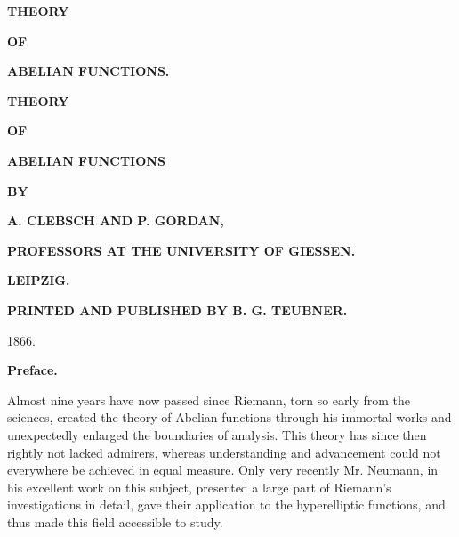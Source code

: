 \documentclass[10pt]{article}
\begin{document}
\small


\begin{center}
{\Large\bfseries THEORY}\par\vspace{1.2em}
{\small\bfseries OF}\par\vspace{1.5em}
{\Large\bfseries ABELIAN FUNCTIONS.}
\end{center}

\clearpage

\begin{center}
{\Large\bfseries THEORY}\par\vspace{1.3em}
{\small\bfseries OF}\par\vspace{1.4em}
{\LARGE\bfseries ABELIAN FUNCTIONS}\par\vspace{2.2em}
{\small\bfseries BY}\par\vspace{1.8em}
{\large\bfseries A. CLEBSCH \quad AND \quad P. GORDAN,}\par
{\scriptsize\bfseries PROFESSORS AT THE UNIVERSITY OF GIESSEN.}\par\vfill
{\Large\bfseries LEIPZIG.}\par
{\bfseries PRINTED AND PUBLISHED BY B. G. TEUBNER.}\par
{\large 1866.}
\end{center}

\clearpage

\begin{center}
{\Large\bfseries Preface.}
\end{center}

Almost nine years have now passed since Riemann, torn so early from the sciences, created the theory of Abelian functions through his immortal works and unexpectedly enlarged the boundaries of analysis. This theory has since then rightly not lacked admirers, whereas understanding and advancement could not everywhere be achieved in equal measure. Only very recently Mr. Neumann, in his excellent work on this subject, presented a large part of Riemann's investigations in detail, gave their application to the hyperelliptic functions, and thus made this field accessible to study.
\end{document}
